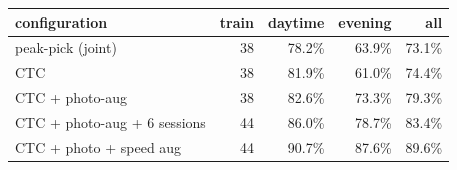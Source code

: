 \begin{tabular}{@{}lrrrr@{}}
\toprule
configuration & train & daytime & evening & all \\
\midrule
peak-pick (joint) & 38 & 78.2\% & 63.9\% & 73.1\% \\
CTC & 38 & 81.9\% & 61.0\% & 74.4\% \\
CTC + photo-aug & 38 & 82.6\% & 73.3\% & 79.3\% \\
CTC + photo-aug + 6 sessions & 44 & 86.0\% & 78.7\% & 83.4\% \\
CTC + photo + speed aug & 44 & 90.7\% & 87.6\% & 89.6\% \\
\bottomrule
\end{tabular}
